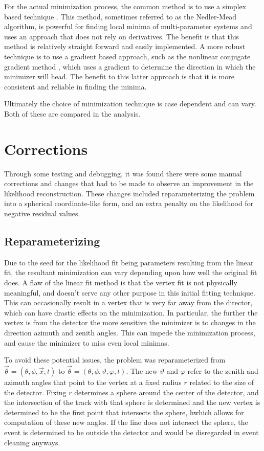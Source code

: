 For the actual minimization process, the common method is to use a simplex based technique \cite{simplex}. This method, sometimes referred to as the Nedler-Mead algorithm, is powerful for finding local minima of multi-parameter systems and uses an approach that does not rely on derivatives. The benefit is that this method is relatively straight forward and easily implemented. A more robust technique is to use a gradient based approach, such as the nonlinear conjugate gradient method \cite{gradient}, which uses a gradient to determine the direction in which the minimizer will head. The benefit to this latter approach is that it is more consistent and reliable in finding the minima.

Ultimately the choice of minimization technique is case dependent and can vary. Both of these are compared in the analysis.

\section{Corrections}

Through some testing and debugging, it was found there were some manual corrections and changes that had to be made to observe an improvement in the likelihood reconstruction. These changes included reparameterizing the problem into a spherical coordinate-like form, and an extra penalty on the likelihood for negative residual values.

\subsection{Reparameterizing}

Due to the seed for the likelihood fit being parameters resulting from the linear fit, the resultant minimization can vary depending upon how well the original fit does. A flaw of the linear fit method is that the vertex fit is not physically meaningful, and doesn't serve any other purpose in this initial fitting technique. This can occasionally result in a vertex that is very far away from the director, which can have drastic effects on the minimization. In particular, the further the vertex is from the detector the more sensitive the minimizer is to changes in the direction azimuth and zenith angles. This can impede the minimization process, and cause the minimizer to miss even local minimas.

To avoid these potential issues, the problem was reparameterized from $\vec{\theta} = (\theta, \phi, \vec{x}, t)$ to $\vec{\theta} = (\theta, \phi, \vartheta, \varphi, t)$. The new $\vartheta$ and $\varphi$ refer to the zenith and azimuth angles that point to the vertex at a fixed radius $r$ related to the size of the detector. Fixing $r$ determines a sphere around the center of the detector, and the intersection of the track with that sphere is determined and the new vertex is determined to be the first point that intersects the sphere, hwhich allows for computation of these new angles. If the line does not intersect the sphere, the event is determined to be outside the detector and would be disregarded in event cleaning anyways. 

